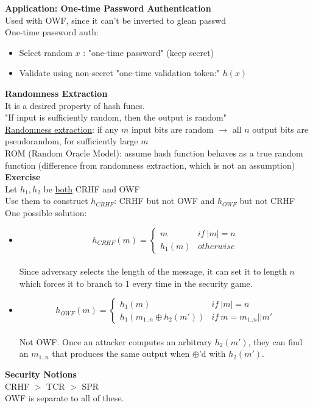 \documentclass{article}
\begin{document}
\textbf{Application: One-time Password Authentication}\\
Used with OWF, since it can't be inverted to glean passwd\\
One-time password auth:\begin{itemize}
	\item Select random $x$ : "one-time password" (keep secret)
	\item Validate using non-secret "one-time validation token:" $h(x)$
\end{itemize}

\textbf{Randomness Extraction}\\
It is a desired property of hash funcs.\\
"If input is sufficiently random, then the output is random"\\
\underline{Randomness extraction}: if any $m$ input bits are random $\rightarrow$ all $n$ output bits are pseudorandom, for sufficiently large $m$\\
ROM (Random Oracle Model): assume hash function behaves as a true random function (difference from randomness extraction, which is not an assumption)\\

\textbf{Exercise}\\
Let $h_1,h_2$ be \underline{both} CRHF and OWF\\
Use them to construct $h_{CRHF}$: CRHF but not OWF and $h_{OWF}$ but not CRHF\\
One possible solution:\begin{itemize}
	\item \[h_{CRHF}(m)=\begin{cases}
		m & if\ |m| = n \\
		h_1(m) & otherwise
	\end{cases}\]\\
	Since adversary selects the length of the message, it can set it to length $n$ which forces it to branch to 1 every time in the security game.
	\item \[h_{OWF}(m)=\begin{cases}
		h_1(m) & if\ |m|=n \\
		h_1(m_{1..n}\oplus h_2(m')) & if\ m=m_{1..n}||m'
	\end{cases}\]\\
	Not OWF. Once an attacker computes an arbitrary $h_2(m')$, they can find an $m_{1..n}$ that produces the same output when $\oplus$'d with $h_2(m')$.
\end{itemize}

\textbf{Security Notions}\\
CRHF $>$  TCR $>$ SPR\\
OWF is separate to all of these.\\
\end{document}
